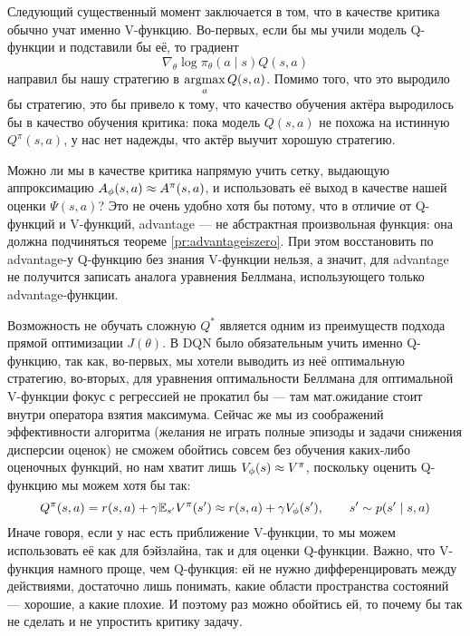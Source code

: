 Следующий существенный момент заключается в том, что в качестве критика обычно учат именно V-функцию. Во-первых, если бы мы учили модель Q-функции и подставили бы её, то градиент
$$\nabla_\theta \log \pi_\theta(a \mid s) Q(s, a)$$
направил бы нашу стратегию в $\mathop{\mathrm{argmax}}\limits_a Q(s, a)$. Помимо того, что это выродило бы стратегию, это бы привело к тому, что качество обучения актёра выродилось бы в качество обучения критика: пока модель $Q(s, a)$ не похожа на истинную $Q^\pi(s, a)$, у нас нет надежды, что актёр выучит хорошую стратегию. 


\begin{remark}
Можно ли мы в качестве критика напрямую учить сетку, выдающую аппроксимацию $A_{\phi}(s, a) \HM\approx A^\pi(s, a)$, и использовать её выход в качестве нашей оценки $\Psi (s, a)$? Это не очень удобно хотя бы потому, что в отличие от Q-функций и V-функций, advantage --- не абстрактная произвольная функция: она должна подчиняться теореме \ref{pr:advantageiszero}. При этом восстановить по advantage-у Q-функцию без знания V-функции нельзя, а значит, для advantage не получится записать аналога уравнения Беллмана, использующего только advantage-функции.
\end{remark}

Возможность не обучать сложную $Q^*$ является одним из преимуществ подхода прямой оптимизации $J(\theta)$. В DQN было обязательным учить именно Q-функцию, так как, во-первых, мы хотели выводить из неё оптимальную стратегию, во-вторых, для уравнения оптимальности Беллмана для оптимальной V-функции фокус с регрессией не прокатил бы --- там мат.ожидание стоит внутри оператора взятия максимума. Сейчас же мы из соображений эффективности алгоритма (желания не играть полные эпизоды и задачи снижения дисперсии оценок) не сможем обойтись совсем без обучения каких-либо оценочных функций, но нам хватит лишь $V_{\phi}(s) \HM\approx V^{\pi}$, поскольку оценить Q-функцию мы можем хотя бы так:
\begin{equation}\label{Qonlineonestep}
Q^\pi(s, a) = r(s, a) + \gamma \mathbb{E}_{s'} V^\pi(s') \approx r(s, a) + \gamma V_{\phi}(s'), \qquad s' \sim p(s' \mid s, a)
\end{equation}
Иначе говоря, если у нас есть приближение V-функции, то мы можем использовать её как для бэйзлайна, так и для оценки Q-функции. Важно, что V-функция намного проще, чем Q-функция: ей не нужно дифференцировать между действиями, достаточно лишь понимать, какие области пространства состояний --- хорошие, а какие плохие. И поэтому раз можно обойтись ей, то почему бы так не сделать и не упростить критику задачу.

